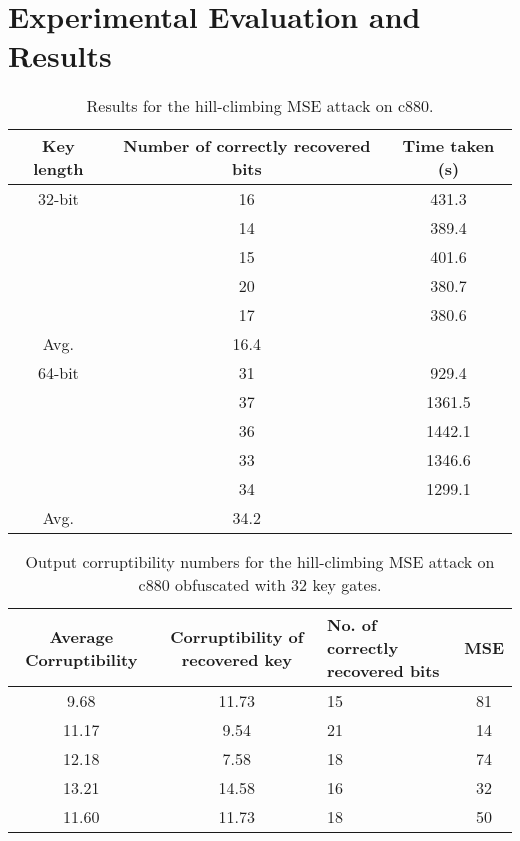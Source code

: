 \section{Experimental Evaluation and Results}






\begin{table*}
\caption{Results for the hill-climbing MSE attack on c880. }
\begin{tabular}{ | c | c | c | }
\hline
Key length & Number of correctly recovered bits & Time taken (s) \\
\hline
32-bit & 16 & 431.3 \\
& 14 & 389.4\\
& 15 & 401.6\\
& 20 & 380.7\\
& 17 & 380.6\\
Avg. & 16.4 &\\
\hline
64-bit & 31 & 929.4\\
& 37 & 1361.5\\
& 36 & 1442.1\\
& 33 & 1346.6\\
& 34 & 1299.1\\
Avg. & 34.2 & \\
\hline
\end{tabular}
\end{table*}

\begin{table*}
\caption{Output corruptibility numbers for the hill-climbing MSE attack on c880 obfuscated with 32 key gates. }
\begin{tabular}{ | c | c | p{5cm} | c | }
\hline
Average Corruptibility  & Corruptibility of recovered key  & No. of correctly recovered bits & MSE\\
\hline
9.68 & 11.73 & 15 & 81\\

11.17 & 9.54 & 21 & 14\\

12.18 & 7.58 & 18 & 74\\

13.21 & 14.58 & 16 & 32\\

11.60 & 11.73 & 18 & 50\\
\hline
\end{tabular}
\end{table*}

